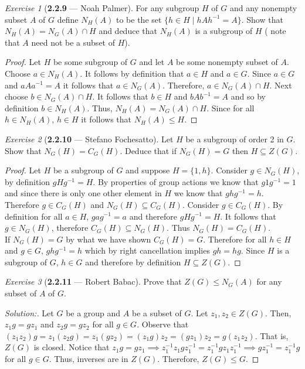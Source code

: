 \documentclass[12pt]{amsart}
\theoremstyle{remark}
\newtheorem*{exercise}{Exercise}%
\theoremstyle{mycomment}
\begin{document}
\begin{exercise}[\textbf{2.2.9} --- Noah Palmer] For any subgroup $H$ of $G$ and any nonempty subset $A$ of $G$ define $N_H(A)$ to be the set $\{h\in H\mid hAh^{-1}=A\}$. Show that $N_H(A)=N_G(A)\cap H$ and deduce that $N_H(A)$ is a subgroup of $H$ ( note that $A$ need not be a subset of $H$).
  \begin{proof}
  Let $H$ be some subgroup of $G$ and let $A$ be some nonempty subset of $A$. Choose $a\in N_H(A)$. It follows by definition that $a\in H$ and $a\in G$. Since $a\in G$ and $aAa^{-1}=A$ it follows that $a\in N_G(A)$. Therefore, $a\in N_G(A)\cap H$. Next choose $b\in N_G(A)\cap H$. It follows that $b\in H$ and $bAb^{-1}=A$ and so by definition $b\in N_H(A)$. Thus, $N_H(A)=N_G(A)\cap H$. Since for all $h\in N_H(A)$, $h\in H$ it follows that $N_H(A)\leq H$.
  \end{proof}
  \end{exercise}
\vspace{.15in}

  

\begin{exercise}[\textbf{2.2.10} --- Stefano Fochesatto] Let $H$ be a subgroup of order 2 in $G$. Show that $N_G(H) = C_G(H)$. Deduce that if $N_G(H) = G$ then $H \subseteq Z(G)$.
  \begin{proof} Let $H$ be a subgroup of $G$ and suppose $H = \{1, h\}$. Consider $g \in N_G(H)$, by definition $gHg^{-1} = H$. By properties of 
    group actions we know that $g1g^{-1} = 1$ and since there is only one other element in $H$ we know that $ghg^{-1} = h$. Therefore $g \in C_G(H)$ and $N_G(H) \subseteq C_G(H)$.
    Consider $g \in C_G(H)$. By definition for all $a \in H$, $gag^{-1} = a$ and therefore $gHg^{-1} = H$. It follows that $g\in N_G(H)$, therefore $C_G(H) \subseteq N_G(H)$. 
    Thus $N_G(H) = C_G(H)$.\\
    If $N_G(H) = G$ by what we have shown $C_G(H) = G$. Therefore for all $h \in H$ and $g \in G$, $ghg^{-1} = h$ which by right cancellation implies $gh = hg$. 
    Since $H$ is a subgroup of $G$, $h \in G$ and therefore by definition $H \subseteq Z(G)$. 
  \end{proof}
\end{exercise}
\vspace{.15in}



\begin{exercise}[\textbf{2.2.11} --- Robert Babac]  
  Prove that $Z(G)\le N_G(A)$ for any subset of $A$ of $G$.
  \begin{proof}[Solution:]
  Let $G$ be a group and $A$ be a subset of $G$. Let $z_1,z_2\in Z(G)$. Then, $z_1g=gz_1$ and $z_2g=gz_2$ for all $g\in G$. Observe that $(z_1z_2)g=z_1(z_2g)=z_1(gz_2)=(z_1g)z_2=(gz_1)z_2=g(z_1z_2)$. That is, $Z(G)$ is closed. Notice that $z_1g=gz_1\implies z_1^{-1}z_1gz_1^{-1}=z_1^{-1}gz_1z_1^{-1}\implies gz_1^{-1}=z_1^{-1}g$ for all $g\in G$. Thus, inverses are in $Z(G)$. Therefore, $Z(G)\le G$.
  \end{proof}
  \end{exercise}
  \vspace{.15in}
  
\end{document}
